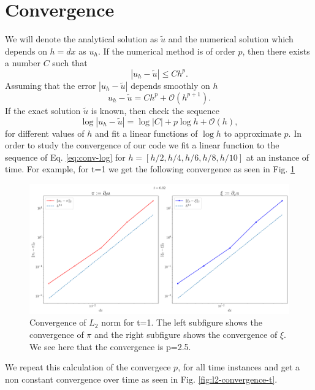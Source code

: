 \documentclass[reprint, prd, nofootinbib, superscriptaddress, floatfix]{revtex4-2}  %
\begin{document}
\section{Convergence}
We will denote the analytical solution as $\tilde{u}$ and the numerical solution which depends on $h=dx$ as $u_h$. If the numerical method is of order $p$, then there exists a number $C$ such that
\begin{equation}
  \label{eq:conv-cond}
  |u_h - \tilde{u}| \leq C h^p.
\end{equation}
Assuming that the error $|u_h - \tilde{u}|$ depends smoothly on $h$
\begin{equation}
  \label{eq:conv-cond2}
  u_h - \tilde{u} = C h^p + \mathcal{O}(h^{p+1}).
\end{equation}
If the exact solution $\tilde{u}$ is known, then check the sequence
\begin{equation}
  \label{eq:conv-log}
  \log|u_h-\tilde{u}| = \log|C|+p\log h + \mathcal{O}(h),
\end{equation}
for different values of $h$ and fit a linear functions of $\log h$ to approximate $p$.
In order to study the convergence of our code we fit a linear function to the sequence of Eq. \ref{eq:conv-log} for $h=[h/2, h/4, h/6, h/8, h/10]$ at an instance of time. For example, for t=1 we get the following convergence as seen in Fig. \ref{fig:l2-convergence-t=1}
\begin{figure}[htbp]
  \includegraphics[width=16cm]{./figures/L2_convergence.png}
  \caption{Convergence of $L_2$ norm for t=1. The left subfigure shows the convergence of $\pi$ and the right subfigure shows the convergence of $\xi$. We see here that the convergence is p=2.5.}
  \label{fig:l2-convergence-t=1}
\end{figure}
We repeat this calculation of the convergece $p$, for all time instances and get a non constant convergence over time as seen in Fig. \ref{fig:l2-convergence-t}.
\end{document}
